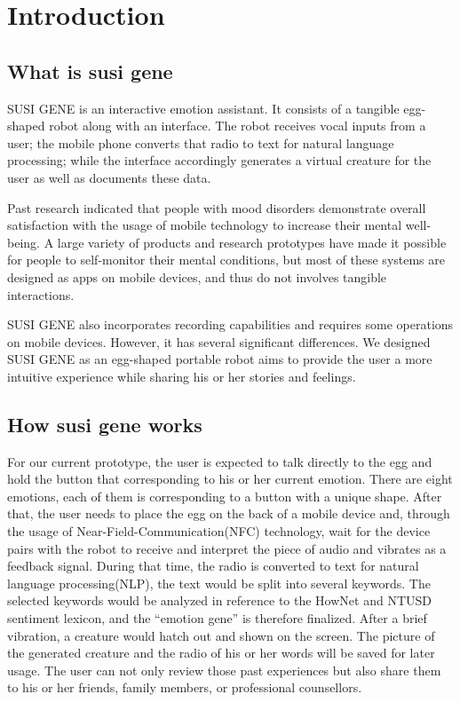 \documentclass[manuscript,screen]{acmart}
\begin{document}
\maketitle

\section{Introduction}

\subsection{What is susi gene}

SUSI GENE is an interactive emotion assistant.  It consists of a tangible egg-shaped robot along with an interface. The robot receives vocal inputs from a user; the mobile phone converts that radio to text for natural language processing; while the interface accordingly generates a virtual creature for the user as well as documents these data.

Past research indicated that people with mood disorders demonstrate overall satisfaction with the usage of mobile technology to increase their mental well-being.\cite{proudfoot2010community}
A large variety of products and research prototypes have made it possible for people to self-monitor their mental conditions, but most of these systems are designed as apps on mobile devices, and thus do not involves tangible interactions.

SUSI GENE also incorporates recording capabilities and requires some operations on mobile devices. However, it has several significant differences. We designed SUSI GENE as an egg-shaped portable robot aims to provide the user a more intuitive experience while sharing his or her stories and feelings. 

\subsection{How susi gene works}

For our current prototype, the user is expected to talk directly to the egg and hold the button that corresponding to his or her current emotion. There are eight emotions, each of them is corresponding to a button with a unique shape. After that, the user needs to place the egg on the back of a mobile device and, through the usage of Near-Field-Communication(NFC) technology, wait for the device pairs with the robot to receive and interpret the piece of audio and vibrates as a feedback signal. During that time, the radio is converted to text for natural language processing(NLP), the text would be split into several keywords. The selected keywords would be analyzed in reference to the HowNet and NTUSD sentiment lexicon, and the “emotion gene” is therefore finalized. After a brief vibration, a creature would hatch out and shown on the screen. The picture of the generated creature and the radio of his or her words will be saved for later usage. The user can not only review those past experiences but also share them to his or her friends, family members, or professional counsellors.
\end{document}
